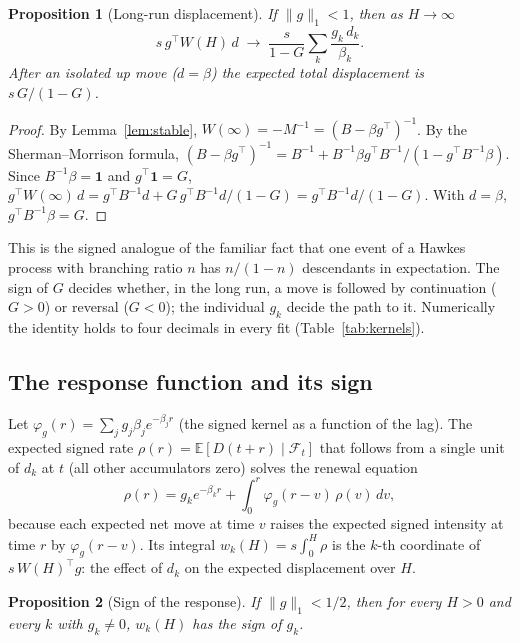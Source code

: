 \documentclass[11pt]{article}
\newtheorem{proposition}{Proposition}
\theoremstyle{definition}
\theoremstyle{remark}
\newcommand{\E}{\mathbb{E}}
\newcommand{\one}{\mathbf{1}}
\begin{document}
\begin{proposition}[Long-run displacement]
\label{prop:longrun}
If $\|g\|_1 < 1$, then as $H \to \infty$
\[
s\, g^\top W(H)\, d \;\longrightarrow\; \frac{s}{1 - G} \sum_k \frac{g_k\, d_k}{\beta_k} .
\]
After an isolated up move ($d = \beta$) the expected total displacement is $s\, G/(1 - G)$.
\end{proposition}

\begin{proof}
By Lemma~\ref{lem:stable}, $W(\infty) = -M^{-1} = (B - \beta g^\top)^{-1}$. By the Sherman--Morrison formula, $(B - \beta g^\top)^{-1} = B^{-1} + B^{-1}\beta g^\top B^{-1} / (1 - g^\top B^{-1}\beta)$. Since $B^{-1}\beta = \one$ and $g^\top \one = G$, $g^\top W(\infty)\, d = g^\top B^{-1} d + G\, g^\top B^{-1} d/(1 - G) = g^\top B^{-1} d / (1 - G)$. With $d = \beta$, $g^\top B^{-1}\beta = G$.
\end{proof}

This is the signed analogue of the familiar fact that one event of a Hawkes process with branching ratio $n$ has $n/(1-n)$ descendants in expectation. The sign of $G$ decides whether, in the long run, a move is followed by continuation ($G > 0$) or reversal ($G < 0$); the individual $g_k$ decide the path to it. Numerically the identity holds to four decimals in every fit (Table~\ref{tab:kernels}).

\subsection{The response function and its sign}

Let $\varphi_g(r) = \sum_j g_j \beta_j e^{-\beta_j r}$ (the signed kernel as a function of the lag). The expected signed rate $\rho(r) = \E[D(t + r) \mid \mathcal F_t]$ that follows from a single unit of $d_k$ at $t$ (all other accumulators zero) solves the renewal equation
\begin{equation}
\rho(r) = g_k e^{-\beta_k r} + \int_0^r \varphi_g(r - v)\, \rho(v)\,dv ,
\label{eq:renewal}
\end{equation}
because each expected net move at time $v$ raises the expected signed intensity at time $r$ by $\varphi_g(r - v)$. Its integral $w_k(H) = s\int_0^H \rho$ is the $k$-th coordinate of $s\, W(H)^\top g$: the effect of $d_k$ on the expected displacement over $H$.

\begin{proposition}[Sign of the response]
\label{prop:sign}
If $\|g\|_1 < 1/2$, then for every $H > 0$ and every $k$ with $g_k \ne 0$, $w_k(H)$ has the sign of $g_k$.
\end{proposition}
\end{document}
